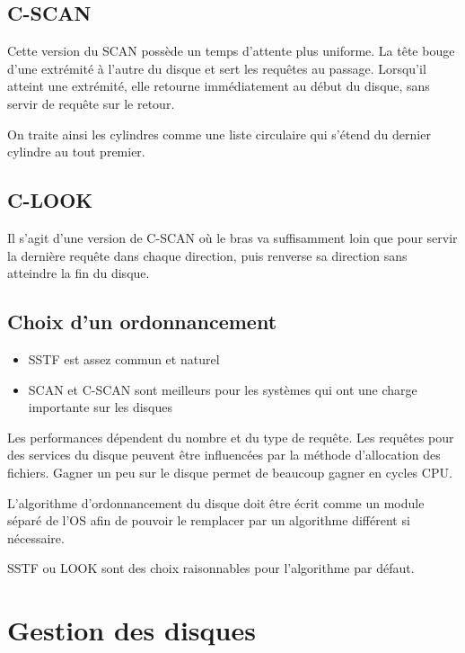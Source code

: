 	\subsection{C-SCAN}
	
	Cette version du SCAN possède un temps d'attente plus uniforme. La tête bouge d'une extrémité à l'autre du disque et sert les requêtes au passage. Lorsqu'il atteint une extrémité, elle retourne immédiatement au début du disque, sans servir de requête sur le retour.
	
	On traite ainsi les cylindres comme une liste circulaire qui s'étend du dernier cylindre au tout premier.
	
	
	\subsection{C-LOOK}
	
	Il s'agit d'une version de C-SCAN où le bras va suffisamment loin que pour servir la dernière requête dans chaque direction, puis renverse sa direction sans atteindre la fin du disque.
	
	
	\subsection{Choix d'un ordonnancement}
	
	\begin{itemize}
		\item SSTF est assez commun et naturel
		\item SCAN et C-SCAN sont meilleurs pour les systèmes qui ont une charge importante sur les disques
	\end{itemize}
	
	Les performances dépendent du nombre et du type de requête. Les requêtes pour des services du disque peuvent être influencées par la méthode d'allocation des fichiers. Gagner un peu sur le disque permet de beaucoup gagner en cycles CPU.
	
	L'algorithme d'ordonnancement du disque doit être écrit comme un module séparé de l'OS afin de pouvoir le remplacer par un algorithme différent si nécessaire.
	
	SSTF ou LOOK sont des choix raisonnables pour l'algorithme par défaut.
	
	
\section{Gestion des disques}

